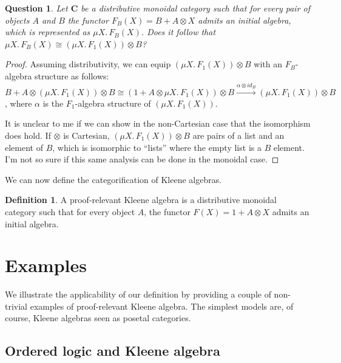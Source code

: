 \documentclass[12pt,a4paper]{article}
\numberwithin{equation}{section}
\newcommand{\cat}{%
\mathbf%
}
\theoremstyle{plain}
\newtheorem{question}[theorem]{Question}
\theoremstyle{definition}
\newtheorem{definition}[theorem]{Definition}
\begin{document}
\begin{question}
  Let $\cat{C}$ be a distributive monoidal category such that for every pair of objects $A$ and $B$ the functor $F_B(X) = B + A \otimes X$ admits an initial algebra, which is represented as $\mu X.\, F_B(X)$. Does it follow that $\mu X.\, F_B(X) \cong (\mu X.\, F_1(X)) \otimes B$?
\end{question}
\begin{proof}
  Assuming distributivity, we can equip $(\mu X.\, F_1(X)) \otimes B$ with an $F_B$-algebra structure as follows: $B + A \otimes (\mu X.\, F_1(X)) \otimes B \cong (1 + A \otimes \mu X.\, F_1(X)) \otimes B \xrightarrow{\alpha \otimes id_B } (\mu X.\, F_1(X)) \otimes B$, where $\alpha$ is the $F_1$-algebra
  structure of $(\mu X.\, F_1(X))$.

  It is unclear to me if we can show in the non-Cartesian case that the isomorphism does hold. If $\otimes$ is Cartesian, $(\mu X.\, F_1(X)) \otimes B$ are pairs of a list and an element of $B$, which is isomorphic to ``lists'' where the empty list is a $B$ element. I'm not so sure if this same analysis can be done in the monoidal case.
\end{proof}

We can now define the categorification of Kleene algebras.

\begin{definition}
  A proof-relevant Kleene algebra is a distributive monoidal category such that for every object $A$, the functor $F(X) = 1 + A \otimes X$ admits an initial algebra.
\end{definition}

\section{Examples}

We illustrate the applicability of our definition by providing a couple of non-trivial examples of proof-relevant Kleene algebra. The simplest models are, of course, Kleene algebras seen as posetal categories.  

\subsection{Ordered logic and Kleene algebra}
\end{document}
